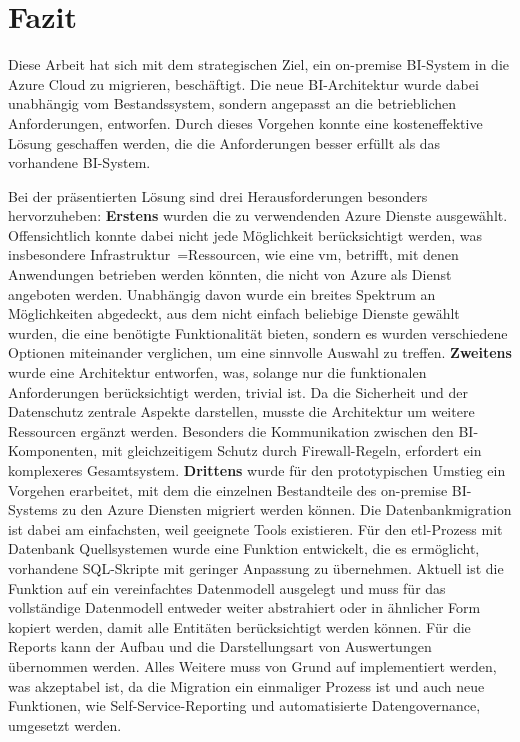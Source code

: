 \chapter{Fazit} \label{ch:zusammenfassung}
Diese Arbeit hat sich mit dem strategischen Ziel, ein on-premise BI-System in die Azure Cloud zu migrieren, beschäftigt. Die neue BI-Architektur wurde dabei unabhängig vom Bestandssystem, sondern angepasst an die betrieblichen Anforderungen, entworfen. Durch dieses Vorgehen konnte eine kosteneffektive Lösung geschaffen werden, die die Anforderungen besser erfüllt als das vorhandene BI-System.

Bei der präsentierten Lösung sind drei Herausforderungen besonders hervorzuheben: \textbf{Erstens} wurden die zu verwendenden Azure Dienste ausgewählt. Offensichtlich konnte dabei nicht jede Möglichkeit berücksichtigt werden, was insbesondere Infrastruktur~=Ressourcen, wie eine \ac{vm}, betrifft, mit denen Anwendungen betrieben werden könnten, die nicht von Azure als Dienst angeboten werden. Unabhängig davon wurde ein breites Spektrum an Möglichkeiten abgedeckt, aus dem nicht einfach beliebige Dienste gewählt wurden, die eine benötigte Funktionalität bieten, sondern es wurden verschiedene Optionen miteinander verglichen, um eine sinnvolle Auswahl zu treffen. \textbf{Zweitens} wurde eine Architektur entworfen, was, solange nur die funktionalen Anforderungen berücksichtigt werden, trivial ist. Da die Sicherheit und der Datenschutz zentrale Aspekte darstellen, musste die Architektur um weitere Ressourcen ergänzt werden. Besonders die Kommunikation zwischen den BI-Komponenten, mit gleichzeitigem Schutz durch Firewall-Regeln, erfordert ein komplexeres Gesamtsystem. \textbf{Drittens} wurde für den prototypischen Umstieg ein Vorgehen erarbeitet, mit dem die einzelnen Bestandteile des on-premise BI-Systems zu den Azure Diensten migriert werden können. Die Datenbankmigration ist dabei am einfachsten, weil geeignete Tools existieren. Für den \ac{etl}-Prozess mit Datenbank Quellsystemen wurde eine Funktion entwickelt, die es ermöglicht, vorhandene SQL-Skripte mit geringer Anpassung zu übernehmen. Aktuell ist die Funktion auf ein vereinfachtes Datenmodell ausgelegt und muss für das vollständige Datenmodell entweder weiter abstrahiert oder in ähnlicher Form kopiert werden, damit alle Entitäten berücksichtigt werden können. Für die Reports kann der Aufbau und die Darstellungsart von Auswertungen übernommen werden. Alles Weitere muss von Grund auf implementiert werden, was akzeptabel ist, da die Migration ein einmaliger Prozess ist und auch neue Funktionen, wie Self-Service-Reporting und automatisierte Datengovernance, umgesetzt werden.

